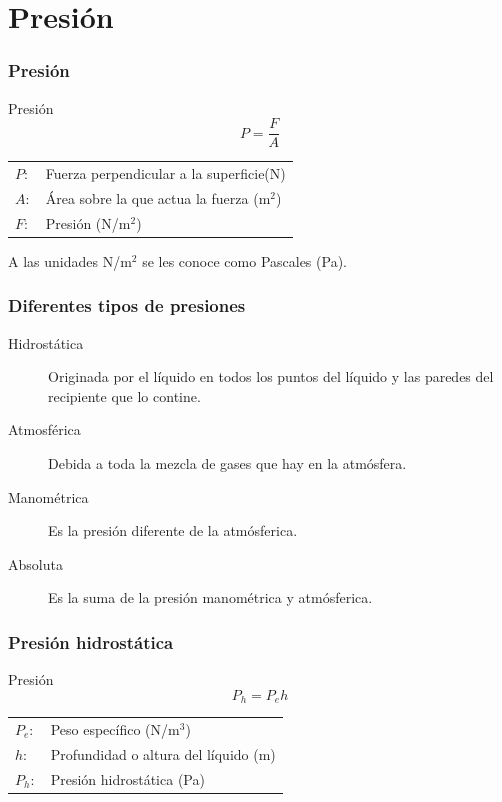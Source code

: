 \documentclass[handout]{beamer}
\begin{document}
\section{Presión}
\begin{frame}
  \frametitle{Presión}
  \begin{block}{Presión}
    {\huge
      \[ P = \frac{F}{A}\]}
  \end{block}
  \begin{tabular}{ll}
    $P:$ & Fuerza perpendicular a la superficie(N) \\
    $A:$ & Área sobre la que actua la fuerza (m$^2$) \\
    $F:$ & Presión (N/m$^2$) \\
  \end{tabular}
  \begin{block}{}
    A las unidades N/m$^2$ se les conoce como Pascales (Pa).
  \end{block}
\end{frame}

\begin{frame}
  \frametitle{Diferentes tipos de presiones}
  \begin{description}
  \item[Hidrostática] Originada por el líquido en todos los puntos del líquido y las
    paredes del recipiente que lo contine.
  \item[Atmosférica] Debida a toda la mezcla de gases que hay en la atmósfera.
  \item[Manométrica] Es la presión diferente de la atmósferica.
  \item[Absoluta] Es la suma de la presión manométrica y atmósferica.
  \end{description}
\end{frame}


\begin{frame}
  \frametitle{Presión hidrostática}
  
  \begin{block}{Presión}
    {\huge
      \[ P_{h} = P_{e}h\]}
  \end{block}
  \begin{tabular}{ll}
    $P_{e}:$ & Peso específico (N/m$^3$) \\
    $h:$ & Profundidad o altura del líquido (m) \\
    $P_{h}:$ & Presión hidrostática (Pa) \\
  \end{tabular}
\end{frame}
\end{document}
